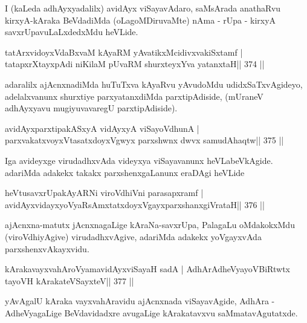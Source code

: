 \begin{artha}
I (kaLeda adhAyxyadalilx) avidAyx viSayavAdaro, saMsArada anathaRvu 
kirxyA-kAraka BeVdadiMda (oLagoMDiruvaMte) nAma - rUpa - kirxyA savxrUpavuLaLxdedxMdu heVLide. 
\end{artha}


\begin{shl}
tatArxvidoyxVdaBxvaM kAyaRM yAvatikxMcidivxvakiSxtamf |
tatapxrXtayxpAdi niKilaM pUvaRM shurxteyxYva yatanxtaH\hfill || 374 ||
\end{shl}

\begin{artha}
adaralilx ajAcnxnadiMda huTuTxva kAyaRvu yAvudoMdu udidxSaTxvAgideyo, 
adelalxvanunx shurxtiye parxyatanxdiMda parxtipAdiside, (mUraneV 
adhAyxyavu mugiyuvavaregU parxtipAdiside).
\end{artha}

\begin{shl}
avidAyxparxtipakASxyA vidAyxyA viSayoV\s dhunA |
parxvakatxvoyxV\s tasatxdoyxVgwyx parxshwnx dwvx samudAhaqtw\hfill || 375 ||
\end{shl}

\begin{artha}
Iga avideyxge virudadhxvAda videyxya viSayavanunx heVLabeVkAgide. adariMda adakekx takakx parxshenxgaLanunx eraDAgi heVLide
\end{artha}

\begin{shl}
heVtusavxrUpakAyARNi viroVdhiVni parasapxramf |
avidAyxvidayxyoVyaRsAmxtatxdoyxVgayxparxshanxgiVrataH\hfill || 376 ||
\end{shl}

\begin{artha}
ajAcnxna-matutx jAcnxnagaLige kAraNa-savxrUpa, PalagaLu oMdakokxMdu  (viroVdhiyAgive) virudadhxvAgive, adariMda adakekx yoVgayxvAda parxshenxvAkayxvidu.
\end{artha}

\begin{shl}
kArakavayxvahAroV\s yamavidAyxviSayaH sadA |
AdhArAdheVyayoVBiRtwtx tayoVH kArakateVSayxteV\hfill || 377 ||
\end{shl}

\begin{artha}
yAvAgalU kAraka vayxvahAravidu ajAcnxnada viSayavAgide, AdhAra -  AdheVyagaLige BeVdavidadxre avugaLige kArakatavxvu saMmatavAgutatxde.
\end{artha}

